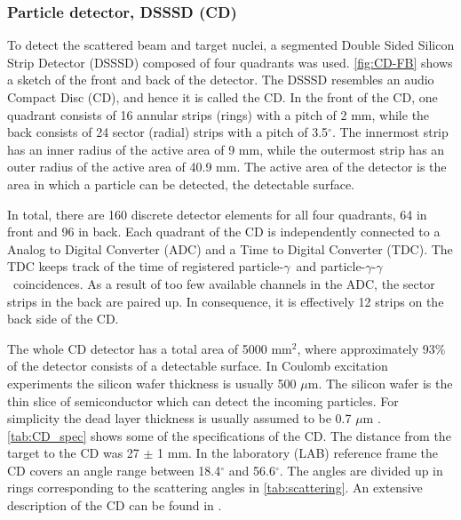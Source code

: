 \documentclass[twoside,english]{uiofysmaster/uiofysmaster}
\newcommand{\ga}{$\gamma$}
\let\orgautoref\autoref
\renewcommand{\autoref}
        {%
		 \def\sectionautorefname{Section}%
		 \def\subsectionautorefname{Section}%
		 \def\subsubsectionautorefname{Section}%
		 \def\chapterautorefname{Chapter}%
          \orgautoref}
\begin{document}
\subsubsection{Particle detector, DSSSD (CD)}
To detect the scattered beam and target nuclei, a segmented Double Sided Silicon Strip Detector (DSSSD) composed of four quadrants was used. 
\autoref{fig:CD-FB} shows a sketch of the front and back of the detector. 
The DSSSD resembles an audio Compact Disc (CD), and hence it is called the CD. 
In the front of the CD, one quadrant consists of 16 annular strips (rings) with a pitch of 2 mm, while the back consists of 24 sector (radial) strips with a pitch of 3.5$^\circ$. 
The innermost strip has an inner radius of the active area of 9 mm, while the outermost strip has an outer radius of the active area of 40.9 mm. 
The active area of the detector is the area in which a particle can be detected, the detectable surface. 

In total, there are 160 discrete detector elements for all four quadrants, 64 in front and 96 in back. 
Each quadrant of the CD is independently connected to a Analog to Digital Converter (ADC) and a Time to Digital Converter (TDC). 
The TDC keeps track of the time of registered particle-\ga\ and particle-\ga-\ga\ coincidences. 
As a result of too few available channels in the ADC, the sector strips in the back are paired up.
In consequence, it is effectively 12 strips on the back side of the CD. 

The whole CD detector has a total area of 5000 mm$^2$, where approximately 93$\%$ of the detector consists of a detectable surface. 
In Coulomb excitation experiments the silicon wafer thickness is usually 500 $\mu$m.
The silicon wafer is the thin slice of semiconductor which can detect the incoming particles. 
For simplicity the dead layer thickness is usually assumed to be 0.7 $\mu$m \cite{NWarr-CD, MB-spect}. 
\autoref{tab:CD_spec} shows some of the specifications of the CD.  
The distance from the target to the CD was 27 $\pm$ 1 mm. 
In the laboratory (LAB) reference frame the CD covers an angle range between 18.4$^\circ$ and 56.6$^\circ$. 
The angles are divided up in rings corresponding to the scattering angles in \autoref{tab:scattering}.
An extensive description of the CD can be found in \cite{CD-DSSSD}.

\end{document}
